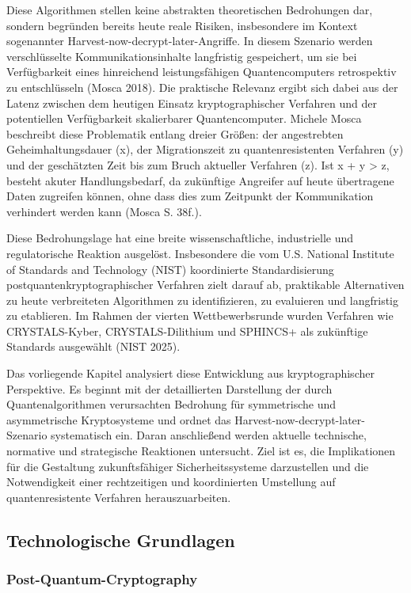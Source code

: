 Diese Algorithmen stellen keine abstrakten theoretischen Bedrohungen dar, sondern begründen bereits heute reale Risiken, insbesondere im Kontext sogenannter Harvest-now-decrypt-later-Angriffe. In diesem Szenario werden verschlüsselte Kommunikationsinhalte langfristig gespeichert, um sie bei Verfügbarkeit eines hinreichend leistungsfähigen Quantencomputers retrospektiv zu entschlüsseln (Mosca 2018). Die praktische Relevanz ergibt sich dabei aus der Latenz zwischen dem heutigen Einsatz kryptographischer Verfahren und der potentiellen Verfügbarkeit skalierbarer Quantencomputer. Michele Mosca beschreibt diese Problematik entlang dreier Größen: der angestrebten Geheimhaltungsdauer (x), der Migrationszeit zu quantenresistenten Verfahren (y) und der geschätzten Zeit bis zum Bruch aktueller Verfahren (z). Ist x + y > z, besteht akuter Handlungsbedarf, da zukünftige Angreifer auf heute übertragene Daten zugreifen können, ohne dass dies zum Zeitpunkt der Kommunikation verhindert werden kann (Mosca S. 38f.).

Diese Bedrohungslage hat eine breite wissenschaftliche, industrielle und regulatorische Reaktion ausgelöst. Insbesondere die vom U.S. National Institute of Standards and Technology (NIST) koordinierte Standardisierung postquantenkryptographischer Verfahren zielt darauf ab, praktikable Alternativen zu heute verbreiteten Algorithmen zu identifizieren, zu evaluieren und langfristig zu etablieren. Im Rahmen der vierten Wettbewerbsrunde wurden Verfahren wie CRYSTALS-Kyber, CRYSTALS-Dilithium und SPHINCS+ als zukünftige Standards ausgewählt (NIST 2025).

Das vorliegende Kapitel analysiert diese Entwicklung aus kryptographischer Perspektive. Es beginnt mit der detaillierten Darstellung der durch Quantenalgorithmen verursachten Bedrohung für symmetrische und asymmetrische Kryptosysteme und ordnet das Harvest-now-decrypt-later-Szenario systematisch ein. Daran anschließend werden aktuelle technische, normative und strategische Reaktionen untersucht. Ziel ist es, die Implikationen für die Gestaltung zukunftsfähiger Sicherheitssysteme darzustellen und die Notwendigkeit einer rechtzeitigen und koordinierten Umstellung auf quantenresistente Verfahren herauszuarbeiten.

\subsection{Technologische Grundlagen}
\subsubsection{Post-Quantum-Cryptography}
